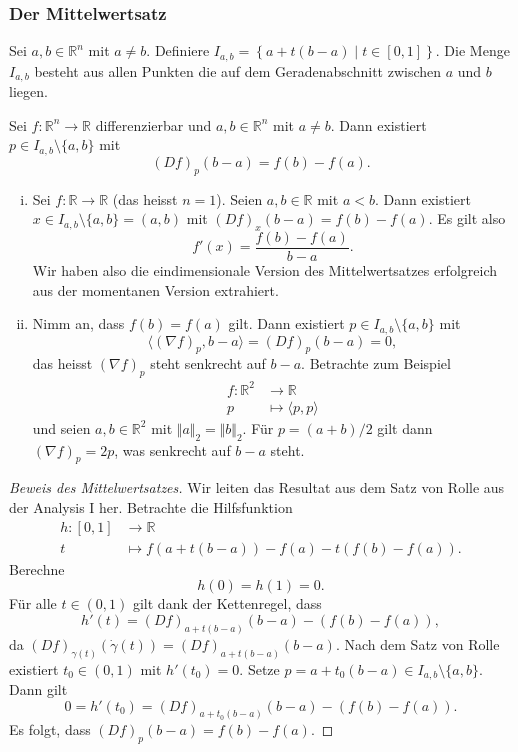 \documentclass[../main.tex]{subfiles}
\begin{document}
\subsubsection*{Der Mittelwertsatz}
Sei $a, b \in \mathbb{R}^n$ mit $a \neq b$.
Definiere $I_{a, b} = \left\{a + t(b-a) \mid t \in [0, 1]\right\}$.
Die Menge $I_{a, b}$ besteht aus allen Punkten die auf dem Geradenabschnitt
zwischen $a$ und $b$ liegen.

\begin{theorem}[Mittelwertsatz]
  Sei $f \colon \mathbb{R}^n \to \mathbb{R}$ differenzierbar
  und $a, b \in \mathbb{R}^n$ mit $a \neq b$.
  Dann existiert $p \in I_{a, b} \setminus \{a, b\}$ mit
  \[
    {(Df)}_p(b-a) = f(b) - f(a).
  \]
\end{theorem}

\begin{specialcases}
  \leavevmode
  \begin{enumerate}[(i)]
    \item Sei $f \colon \mathbb{R} \to \mathbb{R}$ (das heisst $n = 1$).
      Seien $a, b \in \mathbb{R}$ mit $a < b$.
      Dann existiert $x \in I_{a, b} \setminus \{a, b\} = (a, b)$
      mit ${(Df)}_{x}(b-a) = f(b) - f(a)$.
      Es gilt also
      \[
        f'(x) = \frac{f(b) - f(a)}{b-a}.
      \]
      Wir haben also die eindimensionale Version des Mittelwertsatzes
      erfolgreich aus der momentanen Version extrahiert.
    \item Nimm an, dass  $f(b) = f(a)$ gilt.
      Dann existiert $p \in I_{a, b} \setminus \{a, b\}$
      mit
      \[
        \langle {(\nabla f)}_{p}, b-a \rangle
        = {(Df)}_p(b-a) = 0,
      \]
      das heisst ${(\nabla f)}_p$ steht senkrecht auf $b-a$.
      Betrachte zum Beispiel
      \begin{align*}
        f \colon \mathbb{R}^2 & \to \mathbb{R} \\
        p & \mapsto \langle p, p \rangle
      \end{align*}
      und seien $a, b \in \mathbb{R}^2$ mit $\Vert a \Vert_2 = \Vert b \Vert_2$.
      Für $p = (a + b)/2$ gilt dann
      ${(\nabla f)}_p = 2p$, was senkrecht auf $b - a$ steht.
  \end{enumerate}
\end{specialcases}

\begin{proof}[Beweis des Mittelwertsatzes]
  Wir leiten das Resultat aus dem Satz von Rolle aus der
  Analysis I her.
  Betrachte die Hilfsfunktion
  \begin{align*}
    h \colon [0, 1] & \to \mathbb{R} \\
    t & \mapsto f(a + t(b-a)) - f(a) - t(f(b) - f(a)).
  \end{align*}
  Berechne
  \[
    h (0) = h(1) = 0.
  \]
  Für alle $t \in (0, 1)$ gilt dank der Kettenregel, dass
  \[
    h'(t) = {(Df)}_{a + t(b-a)}(b-a) - (f(b) - f(a)),
  \]
  da ${(Df)}_{\gamma(t)}(\dot \gamma(t)) = {(Df)}_{a + t(b-a)}(b-a)$.
  Nach dem Satz von Rolle existiert $t_0 \in (0, 1)$
  mit $h'(t_0) = 0$.
  Setze $p = a + t_0(b-a) \in I_{a, b} \setminus \{a, b\}$.
  Dann gilt
  \[
    0 = h'(t_0) = {(Df)}_{a + t_0(b-a)}(b-a) - (f(b) - f(a)).
  \]
  Es folgt, dass ${(Df)}_p(b-a) = f(b) - f(a)$.
\end{proof}
\end{document}
